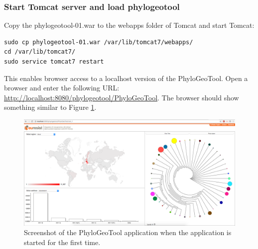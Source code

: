 \documentclass[a4paper, 11pt]{article} %
\begin{document}
\subsubsection{Start Tomcat server and load phylogeotool}

Copy the phylogeotool-01.war to the webapps folder of Tomcat and start Tomcat:
\begin{verbatim}
sudo cp phylogeotool-01.war /var/lib/tomcat7/webapps/
cd /var/lib/tomcat7/
sudo service tomcat7 restart
\end{verbatim}
This enables browser access to a localhost version of the PhyloGeoTool.
Open a browser and enter the following URL: \url{http://localhost:8080/phylogeotool/PhyloGeoTool}.
The browser should show something similar to Figure \ref{fig:01}.


\begin{figure}[!htbp]
\includegraphics[scale=0.19]{images/defaultScreenshot.png}
\caption{Screenshot of the PhyloGeoTool application when the application is started for the first time.}
\label{fig:01} 
\end{figure}
\end{document}
